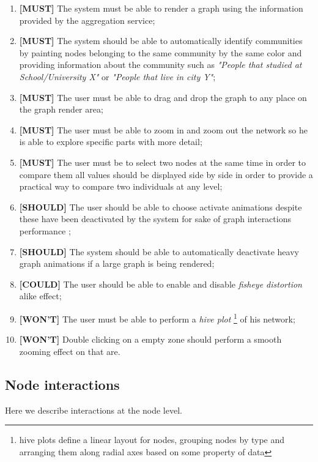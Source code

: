 \begin{enumerate}
    \item \textbf{[MUST]} The system must be able to render a graph using the information provided by the aggregation service;
    \item \textbf{[MUST]} The system should be able to automatically identify communities by painting nodes belonging to the same community by the same color and providing
    information about the community such as \textit{"People that studied at School/University X"} or \textit{"People that live in city Y"};
    \item \textbf{[MUST]} The user must be able to drag and drop the graph to any place on the graph render area;
    \item \textbf{[MUST]} The user must be able to zoom in and zoom out the network so he is able to explore specific parts with more detail;
    \item \textbf{[MUST]} The user must be to select two nodes at the same time in order to compare them all values should be displayed side by side in order to provide a practical way to compare two individuals at any level;
    \item \textbf{[SHOULD]} The user should be able to choose activate animations despite these have been deactivated by the system for sake of graph interactions performance ;
    \item \textbf{[SHOULD]} The system should be able to automatically deactivate heavy graph animations if a large graph is being rendered;
    \item \textbf{[COULD]} The user should be able to enable and disable \textit{fisheye distortion} alike effect; %
    \item \textbf{[WON'T]} The user must be able to perform a \textit{hive plot} \footnote{hive plots define a linear layout for nodes, grouping nodes by type and arranging them along radial axes based on some property of data} of his network;
    \item \textbf{[WON'T]} Double clicking on a empty zone should perform a smooth zooming effect on that are. %
\end{enumerate}

\subsection{Node interactions}

Here we describe interactions at the node level.

